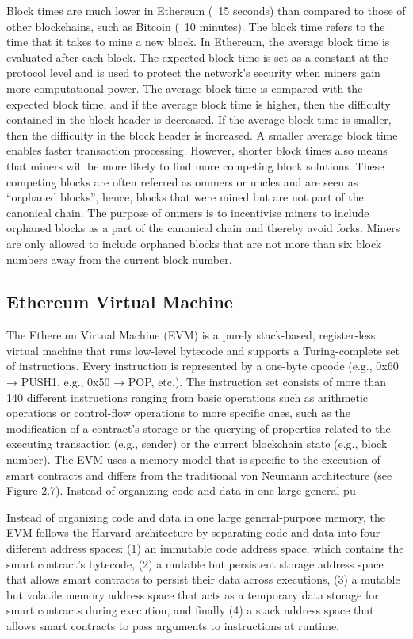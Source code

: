         Block times are much lower in Ethereum (~15 seconds) than compared to those of other blockchains, such as Bitcoin (~10 minutes). The block time refers to the time that it takes to mine a new block. In Ethereum, the average block time is evaluated after each block. The expected block time is set as a constant at the protocol level and is used to protect the network’s security when miners gain more computational power. The average block time is compared with the expected block time, and if the average block time is higher, then the difficulty contained in the block header is decreased. If the average block time is smaller, then the difficulty in the block header is increased. A smaller average block time enables faster transaction processing. However, shorter block times also means that miners will be more likely to find more competing block solutions. These competing blocks are often referred as ommers or uncles and are seen as “orphaned blocks”, hence, blocks that were mined but are not part of the canonical chain. The purpose of ommers is to incentivise miners to include orphaned blocks as a part of the canonical chain and thereby avoid forks. Miners are only allowed to include orphaned blocks that are not more than six block numbers away from the current block number.

    \subsection{Ethereum Virtual Machine}
        The Ethereum Virtual Machine (EVM) is a purely stack-based, register-less virtual machine that runs low-level bytecode and supports a Turing-complete set of instructions. Every instruction is represented by a one-byte opcode (e.g., 0x60 → PUSH1, e.g., 0x50 → POP, etc.). The instruction set consists of more than 140 different instructions ranging from basic operations such as arithmetic operations or control-flow operations to more specific ones, such as the modification of a contract’s storage or the querying of properties related to the executing transaction (e.g., sender) or the current blockchain state (e.g., block number). The EVM uses a memory model that is specific to the execution of smart contracts and differs from the traditional von Neumann architecture (see Figure 2.7). Instead of organizing code and data in one large general-pu

        Instead of organizing code and data in one large general-purpose memory, the EVM follows the Harvard architecture by separating code and data into four different address spaces: (1) an immutable code address space, which contains the smart contract’s bytecode, (2) a mutable but persistent storage address space that allows smart contracts to persist their data across executions, (3) a mutable but volatile memory address space that acts as a temporary data storage for smart contracts during execution, and finally (4) a stack address space that allows smart contracts to pass arguments to instructions at runtime.

